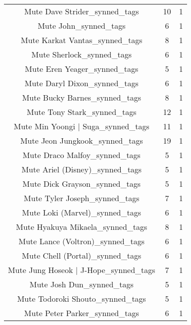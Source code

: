 \begin{table}[h!]
{\begin{tabular}{|c|c|c|}
                     Mute Dave Strider\_synned\_tags &          10 &          1 \\
                             Mute John\_synned\_tags &           6 &          1 \\
                    Mute Karkat Vantas\_synned\_tags &           8 &          1 \\
                         Mute Sherlock\_synned\_tags &           6 &          1 \\
                      Mute Eren Yeager\_synned\_tags &           5 &          1 \\
                      Mute Daryl Dixon\_synned\_tags &           6 &          1 \\
                     Mute Bucky Barnes\_synned\_tags &           8 &          1 \\
                       Mute Tony Stark\_synned\_tags &          12 &          1 \\
                Mute Min Yoongi | Suga\_synned\_tags &          11 &          1 \\
                    Mute Jeon Jungkook\_synned\_tags &          19 &          1 \\
                     Mute Draco Malfoy\_synned\_tags &           5 &          1 \\
                   Mute Ariel (Disney)\_synned\_tags &           5 &          1 \\
                     Mute Dick Grayson\_synned\_tags &           5 &          1 \\
                     Mute Tyler Joseph\_synned\_tags &           7 &          1 \\
                    Mute Loki (Marvel)\_synned\_tags &           6 &          1 \\
                  Mute Hyakuya Mikaela\_synned\_tags &           8 &          1 \\
                  Mute Lance (Voltron)\_synned\_tags &           6 &          1 \\
                   Mute Chell (Portal)\_synned\_tags &           6 &          1 \\
             Mute Jung Hoseok | J-Hope\_synned\_tags &           7 &          1 \\
                         Mute Josh Dun\_synned\_tags &           5 &          1 \\
                  Mute Todoroki Shouto\_synned\_tags &           5 &          1 \\
                     Mute Peter Parker\_synned\_tags &           6 &          1 \\

\end{tabular}}
\end{table}

